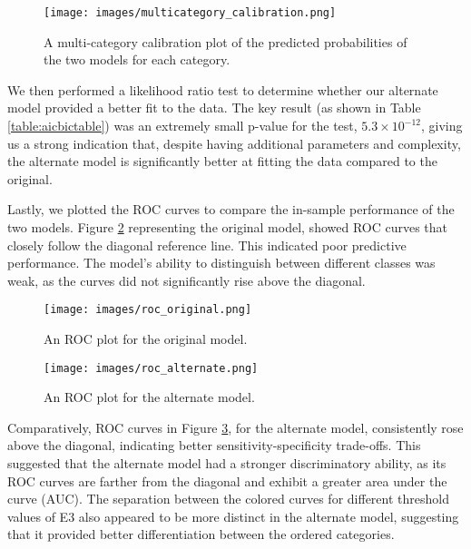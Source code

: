 \documentclass[titlepage]{article}
\begin{document}
\begin{figure}[H]
    \centering
    \texttt{[image: images/multicategory\_calibration.png]}
    \caption{A multi-category calibration plot of the predicted probabilities of the two models for each category.}
    \label{fig:calib_plot}
\end{figure}

\justify
We then performed a likelihood ratio test to determine whether our alternate model provided a better fit to the data. The key result (as shown in Table \ref{table:aicbictable}) was an extremely small p-value for the test, $5.3 \times 10^{-12}$, giving us a strong indication that, despite having additional parameters and complexity, the alternate model is significantly better at fitting the data compared to the original.

\justify
Lastly, we plotted the ROC curves to compare the in-sample performance of the two models. Figure \ref{fig:roc_orig} representing the original model, showed ROC curves that closely follow the diagonal reference line. This indicated poor predictive performance. The model’s ability to distinguish between different classes was weak, as the curves did not significantly rise above the diagonal.


\begin{figure}[H]
    \centering
    \texttt{[image: images/roc\_original.png]}
    \caption{An ROC plot for the original model.}
    \label{fig:roc_orig}
\end{figure}

\begin{figure}[H]
    \centering
    \texttt{[image: images/roc\_alternate.png]}
    \caption{An ROC plot for the alternate model.}
    \label{fig:roc_alter}
\end{figure}

\justify
Comparatively, ROC curves in Figure \ref{fig:roc_alter}, for the alternate model, consistently rose above the diagonal, indicating better sensitivity-specificity trade-offs. This suggested that the alternate model had a stronger discriminatory ability, as its ROC curves are farther from the diagonal and exhibit a greater area under the curve (AUC). The separation between the colored curves for different threshold values of E3 also appeared to be more distinct in the alternate model, suggesting that it provided better differentiation between the ordered categories.
\end{document}
